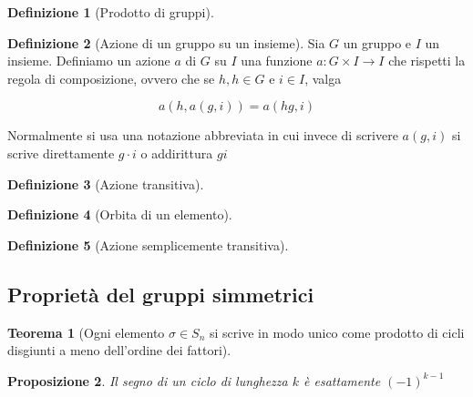 \documentclass[11pt]{article}
\theoremstyle{plain}
\newtheorem{thm}{Teorema}[section]
\newtheorem{prop}[thm]{Proposizione}
\theoremstyle{definition}
\newtheorem{defn}{Definizione}[section]
\theoremstyle{remark}
\begin{document}
\begin{defn}[Prodotto di gruppi]

\end{defn}

\begin{defn}[Azione di un gruppo su un insieme] Sia $G$ un gruppo e $I$ un insieme. Definiamo un azione $a$ di $G$ su $I$ una funzione $a:G\times I \to I$ che rispetti la regola di composizione, ovvero che se $h,h\in G$ e $i \in I$, valga

\[ a(h,a(g,i)) = a(hg, i) \]

Normalmente si usa una notazione abbreviata in cui invece di scrivere $a(g,i)$ si scrive direttamente $g\cdot i$ o addirittura $gi$


\label{defn:azione}
\end{defn}


\begin{defn}[Azione transitiva]



\label{defn:azione transitiva}
\end{defn}


\begin{defn}[Orbita di un elemento]


\label{defn:orbita}
\end{defn}




\begin{defn}[Azione semplicemente transitiva]

\end{defn}



















\newpage
\subsection{Proprietà del gruppi simmetrici}

\begin{thm}[Ogni elemento $\sigma \in S_n$ si scrive in modo unico come prodotto di cicli disgiunti a meno dell'ordine dei fattori]


\end{thm}

\begin{prop}Il segno di un ciclo di lunghezza $k$ è esattamente $(-1)^{k-1}$


\end{prop}
\end{document}
